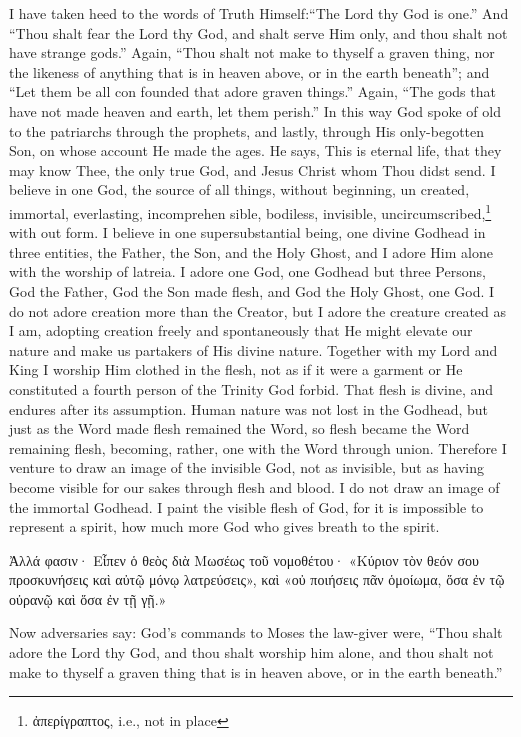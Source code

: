 \documentclass[10pt]{book}
\newcommand{\switchgreek}[1][]{\selectlanguage{polutonikogreek} \switchcolumn*[#1]}
\newcommand{\switchenglish}{\selectlanguage{english} \switchcolumn}
\begin{document}
\begin{paracol}{2}
I have taken heed to the words of Truth 
Himself:\textemdash ``The Lord thy God is one.'' And 
``Thou shalt fear the Lord thy God, and shalt 
serve Him only, and thou shalt not have 
strange gods.'' Again, ``Thou shalt not make 
to thyself a graven thing, nor the likeness of 
anything that is in heaven above, or in the 
earth beneath''; and ``Let them be all con 
founded that adore graven things.'' Again, 
``The gods that have not made heaven and 
earth, let them perish.'' In this way God spoke 
of old to the patriarchs through the prophets, 
and lastly, through His only-begotten Son, on 
whose account He made the ages. He says, 
This is eternal life, that they may know Thee, 
the only true God, and Jesus Christ whom 
Thou didst send. I believe in one God, the 
source of all things, without beginning, un 
created, immortal, everlasting, incomprehen 
sible, bodiless, invisible, uncircumscribed,\footnote{ἀπερίγραπτος, i.e., not in place} with 
out form. I believe in one supersubstantial 
being, one divine Godhead in three entities, 
the Father, the Son, and the Holy Ghost, 
and I adore Him alone with the worship 
of latreia. I adore one God, one Godhead 
but three Persons, God the Father, God the 
Son made flesh, and God the Holy Ghost, one 
God. I do not adore creation more than the 
Creator, but I adore the creature created as I 
am, adopting creation freely and spontaneously 
that He might elevate our nature and make us 
partakers of His divine nature. Together with 
my Lord and King I worship Him clothed in 
the flesh, not as if it were a garment or He 
constituted a fourth person of the Trinity\textemdash 
God forbid. That flesh is divine, and endures 
after its assumption. Human nature was not 
lost in the Godhead, but just as the Word 
made flesh remained the Word, so flesh became 
the Word remaining flesh, becoming, rather, 
one with the Word through union. Therefore I venture to draw an image 
of the invisible God, not as invisible, but as 
having become visible for our sakes through 
flesh and blood. I do not draw an image of 
the immortal Godhead. I paint the visible 
flesh of God, for it is impossible to represent 
a spirit, how much more God who gives 
breath to the spirit.

\switchgreek

Ἀλλά φασιν· Εἶπεν ὁ θεὸς διὰ Μωσέως τοῦ νομοθέτου· «Κύριον τὸν θεόν σου προσκυνήσεις καὶ αὐτῷ μόνῳ λατρεύσεις», καὶ «οὐ ποιήσεις πᾶν ὁμοίωμα, ὅσα ἐν τῷ οὐρανῷ καὶ ὅσα ἐν τῇ γῇ.»

\switchenglish

Now adversaries say: God's commands to 
Moses the law-giver were, ``Thou shalt adore 
the Lord thy God, and thou shalt worship him 
alone, and thou shalt not make to thyself a 
graven thing that is in heaven above, or in the 
earth beneath.'' 


\end{paracol}
\end{document}

